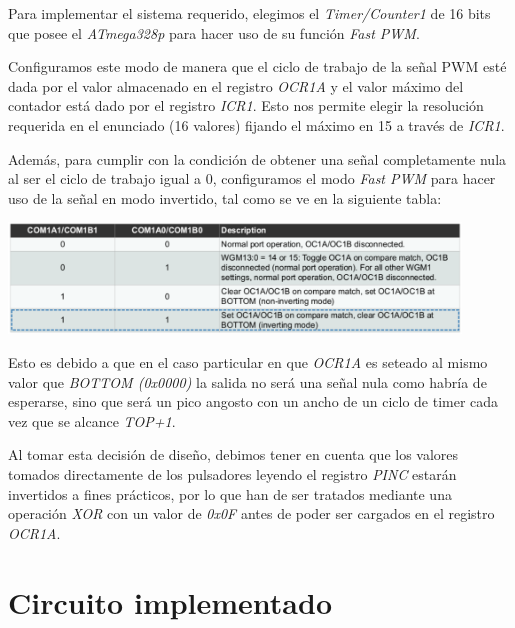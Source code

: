 \documentclass[a4paper, 12pt]{article}
\begin{document}
\newpage
{}

Para implementar el sistema requerido, elegimos el \textit{Timer/Counter1} de 16 bits que posee el \textit{ATmega328p} para hacer uso de su función \textit{Fast PWM}.

Configuramos este modo de manera que el ciclo de trabajo de la señal PWM esté dada por el valor almacenado en el registro \textit{OCR1A} y el valor máximo del contador está dado por el registro \textit{ICR1}. Esto nos permite elegir la resolución requerida en el enunciado (16 valores) fijando el máximo en 15 a través de \textit{ICR1}.

Además, para cumplir con la condición de obtener una señal completamente nula al ser el ciclo de trabajo igual a 0, configuramos el modo \textit{Fast PWM} para hacer uso de la señal en modo invertido, tal como se ve en la siguiente tabla:

\begin{center}
	\includegraphics[width=12cm]{tabla.png}
\end{center}

Esto es debido a que en el caso particular en que \textit{OCR1A} es seteado al mismo valor que \textit{BOTTOM (0x0000)} la salida no será una señal nula como habría de esperarse, sino que será un pico angosto con un ancho de un ciclo de timer cada vez que se alcance \textit{TOP+1}.

Al tomar esta decisión de diseño, debimos tener en cuenta que los valores tomados directamente de los pulsadores leyendo el registro \textit{PINC} estarán invertidos a fines prácticos, por lo que han de ser tratados mediante una operación \textit{XOR} con un valor de \textit{0x0F} antes de poder ser cargados en el registro \textit{OCR1A}.

\section{Circuito implementado}
\end{document}
